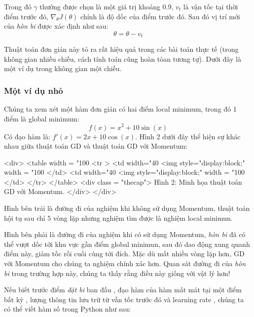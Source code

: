 Trong đó $\gamma$ thường được chọn là một giá trị khoảng 0.9, $v_t$ là vận tốc tại thời điểm trước đó, $ \nabla_{\theta}J(\theta)$ chính là độ dốc của điểm trước đó.  
Sau đó vị trí mới của \textit{hòn bi} được xác định như sau: 
\begin{equation*} 
\theta = \theta - v_t 
\end{equation*} 
 
Thuật toán đơn giản này tỏ ra rất hiệu quả trong các bài toán thực tế (trong không gian nhiều chiều, cách tính toán cũng hoàn tòan tương tự). Dưới đây là một ví dụ trong không gian một chiều. 
 
 
\subsubsection{Một ví dụ nhỏ}
Chúng ta xem xét một hàm đơn giản có hai điểm local minimum, trong đó 1 điểm là global minimum: 
\begin{equation*} 
f(x) = x^2 + 10\sin(x) 
\end{equation*} 
Có đạo hàm là: $f'(x) = 2x + 10\cos(x)$. Hình 2 dưới đây thể hiện sự khác nhau giữa thuật toán GD và thuật toán GD với Momentum: 
 
<div> 
<table width = "100%
   <tr > 
        <td width="40%
        <img style="display:block;" width = "100%
         </td> 
        <td width="40%
        <img style="display:block;" width = "100%
        </td> 
    </tr> 
</table>  
<div class = "thecap"> Hình 2: Minh họa thuật toán GD với Momentum. </div> 
</div> 
 
Hình bên trái là đường đi của nghiệm khi không sử dụng Momentum, thuật toán hội tụ sau chỉ 5 vòng lặp nhưng nghiệm tìm được là nghiệm local minimun. 
 
Hình bên phải là đường đi của nghiệm khi có sử dụng Momentum, \textit{hòn bi} đã có thể vượt dốc tới khu vực gần điểm global minimun, sau đó dao động xung quanh điểm này, giảm tốc rồi cuối cùng tới đích. Mặc dù mất nhiều vòng lặp hơn, GD với Momentum cho chúng ta nghiệm chính xác hơn. Quan sát đường đi của \textit{hòn bi} trong trường hợp này, chúng ta thấy rằng điều này giống với vật lý hơn! 
 
Nếu biết trước điểm \textit{đặt bi} ban đầu , đạo hàm của hàm mất mát tại một điểm bất kỳ , lượng thông tin lưu trữ từ vần tốc trước đó  và learning rate , chúng ta có thể viết hàm số  trong Python như sau: 
 
